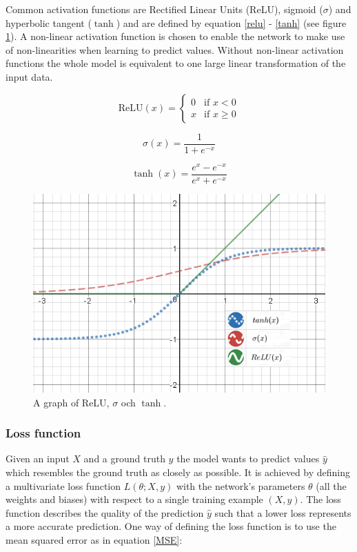 \documentclass[a4paper,11pt,twoside]{article}
\begin{document}
Common activation functions are Rectified Linear Units (ReLU), sigmoid ($\sigma$) and hyperbolic tangent ($\tanh$) and are defined by equation \eqref{relu} - \eqref{tanh} (see figure \ref{activation_function}). A non-linear activation function is chosen to enable the network to make use of non-linearities when learning to predict values. Without non-linear activation functions the whole model is equivalent to one large linear transformation of the input data. \cite{cs231n}

\begin{equation}\label{relu}
\mbox{ReLU}{(x)} = \begin{cases} 
			0 & \mbox{if } x < 0 \\ 
			x & \mbox{if } x \geq 0 
		\end{cases}
\end{equation}

\begin{equation}\label{sigmoid}
\sigma(x) = \frac{1}{1+e^{-x}}
\end{equation}

\begin{equation}\label{tanh}
\tanh{(x)} = \frac{e^x-e^{-x}}{e^x+e^{-x}}
\end{equation}

\begin{figure}[h]
	\centering
  		\includegraphics[scale=0.83]{activationfunction.png}
  	\caption{A graph of ReLU, $\sigma$ och $\tanh$.} \label{activation_function}
\end{figure}

\subsubsection{Loss function}
Given an input $X$ and a ground truth $y$ the model wants to predict values $\hat{y}$ which resembles the ground truth as closely as possible. It is achieved by defining a multivariate loss function $L(\theta; X, y)$  with the network's parameters $\theta$ (all the weights and biases) with respect to a single training example $(X, y)$. The loss function describes the quality of the prediction $\hat{y}$ such that a lower loss represents a more accurate prediction. One way of defining the loss function is to use the mean squared error as in equation \eqref{MSE}: \cite{cs231n}
\end{document}
